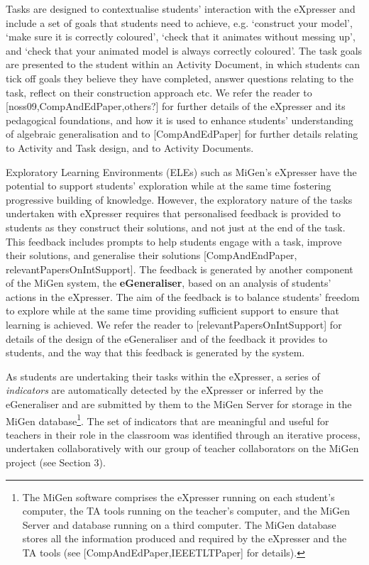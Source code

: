 Tasks are designed to contextualise students' interaction with the
eXpresser and include a set of goals that students need to achieve,
e.g. `construct your model', `make sure it is correctly coloured',
`check that it animates without messing up', and `check that your
animated model is always correctly coloured'. The task goals are
presented to the student within an Activity Document, in which
students can tick off goals they believe they have completed, answer
questions relating to the task, reflect on their construction approach
etc. We refer the reader to [noss09,CompAndEdPaper,others?] for
further details of the eXpresser and its pedagogical foundations, and
how it is used to enhance students’ understanding of algebraic
generalisation and to [CompAndEdPaper] for further details relating to
Activity and Task design, and to Activity Documents.  

Exploratory Learning Environments (ELEs) such as MiGen’s eXpresser
have the potential to support students' exploration while at the same
time fostering progressive building of knowledge. However, the
exploratory nature of the tasks undertaken with eXpresser requires
that personalised feedback is provided to students as they construct
their solutions, and not just at the end of the task. This feedback
includes prompts to help students engage with a task, improve their
solutions, and generalise their solutions [CompAndEndPaper,
relevantPapersOnIntSupport]. The feedback is generated by another
component of the MiGen system, the {\bf eGeneraliser}, based on an
analysis of students’ actions in the eXpresser. The aim of the
feedback is to balance students' freedom to explore while at the same
time providing sufficient support to ensure that learning is
achieved. We refer the reader to [relevantPapersOnIntSupport] for
details of the design of the eGeneraliser and of the feedback it
provides to students, and the way that this feedback is generated by
the system.  
 
As students are undertaking their tasks within the eXpresser, a series
of {\em indicators} are automatically detected by the eXpresser or
inferred by the eGeneraliser and are submitted by them to the MiGen
Server for storage in the MiGen database\footnote{The MiGen software
  comprises the eXpresser running on each student’s computer, the TA
  tools running on the teacher’s computer, and the MiGen Server and
  database running on a third computer. The MiGen database stores all
  the information produced and required by the eXpresser and the TA
  tools (see [CompAndEdPaper,IEEETLTPaper] for details).}.   
The set of indicators that are meaningful and useful for teachers in
their role in the classroom was identified through an iterative
process, undertaken collaboratively with our group of teacher
collaborators on the MiGen project (see Section 3).  


